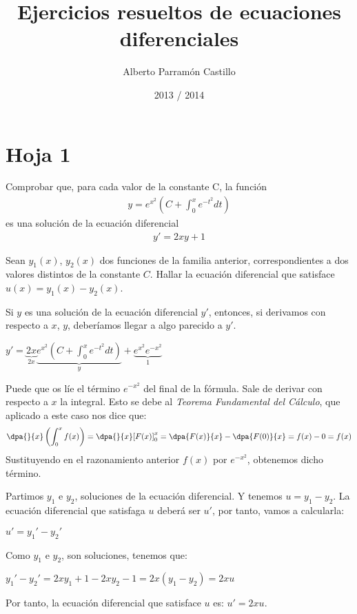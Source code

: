 \documentclass[nochap]{apuntes}
\title{Ejercicios resueltos de ecuaciones diferenciales}
\author{Alberto Parramón Castillo}
\date{2013 / 2014}
\begin{document}
\pagestyle{plain}
\maketitle
\tableofcontents
\newpage

\section{Hoja 1}

\begin{problem}[1]
\ppart Comprobar que, para cada valor de la constante C, la función
\begin{gather*}
y=e^{x^2}\left(C+\int_0^x e^{-t^2}dt\right)
\end{gather*}
	es una solución de la ecuación diferencial
\begin{gather*}
y'=2xy+1
\end{gather*}

\ppart Sean $y_1(x)$, $y_2(x)$ dos funciones de la familia anterior, correspondientes a dos valores distintos de la constante $C$. Hallar la ecuación diferencial que satisface $u(x)=y_1(x)-y_2(x)$.

\solution

\spart
\begin{expla}
Si $y$ es una solución de la ecuación diferencial $y'$, entonces, si derivamos con respecto a $x$, $y$, deberíamos llegar a algo parecido a $y'$.
\end{expla}
$y'=\underbrace{2x}_{2x}\underbrace{e^{x^2}(C+\int_0^x e^{-t^2}dt)}_y+\underbrace{e^{x^2}e^{-x^2}}_1$
\begin{expla}
Puede que os líe el término $e^{-x^2}$ del final de la fórmula. Sale de derivar con respecto a $x$ la integral. Esto se debe al \textit{Teorema Fundamental del Cálculo}, que aplicado a este caso nos dice que: 
\begin{gather*}
\dpa{}{x}\left(\int_0^x f(x)\right)=\dpa{}{x}[F(x)]_0^x=\dpa{F(x)}{x}-\dpa{F(0)}{x}=f(x)-0=f(x)
\end{gather*}
Sustituyendo en el razonamiento anterior $f(x)$ por $e^{-x^2}$, obtenemos dicho término.
\end{expla}


\spart
Partimos $y_1$ e $y_2$, soluciones de la ecuación diferencial. Y tenemos $u=y_1-y_2$. La ecuación diferencial que satisfaga $u$ deberá ser $u'$, por tanto, vamos a calcularla:

$u'=y_1'-y_2'$

Como $y_1$ e $y_2$, son soluciones, tenemos que:

$y_1'-y_2'=2xy_1+1-2xy_2-1=2x(y_1-y_2)=2xu$

Por tanto, la ecuación diferencial que satisface $u$ es: $u'=2xu$.

\end{problem}
\newpage
\end{document}
